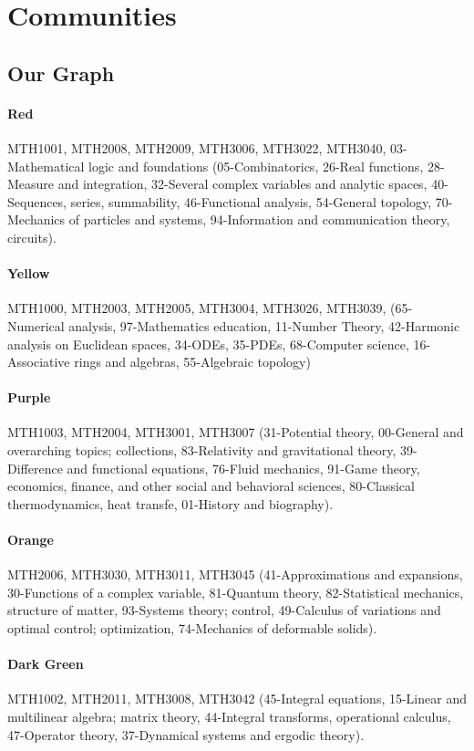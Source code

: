 \documentclass[english, 12pt]{article}
\begin{document}
\section{Communities}\label{app:communities_comp}
\subsection{Our Graph} \label{app:our_graph_communities}
\paragraph{Red} MTH1001, MTH2008, MTH2009, MTH3006, MTH3022, MTH3040,  03-Mathematical logic and foundations (05-Combinatorics, 26-Real functions, 28- Measure and integration, 32-Several complex variables and analytic spaces, 40-Sequences, series, summability, 46-Functional analysis, 54-General topology, 70-Mechanics of particles and systems, 94-Information and communication theory, circuits).
\parskip=-16.0pt
\paragraph{Yellow} MTH1000, MTH2003, MTH2005, MTH3004, MTH3026, MTH3039, (65-Numerical analysis, 97-Mathematics education, 11-Number Theory, 42-Harmonic analysis on Euclidean spaces, 34-ODEs, 35-PDEs, 68-Computer science, 16-Associative rings and algebras, 55-Algebraic topology)
\paragraph{Purple} MTH1003, MTH2004, MTH3001, MTH3007 (31-Potential theory, 00-General and overarching topics; collections, 83-Relativity and gravitational theory, 39-Difference and functional equations, 76-Fluid mechanics, 91-Game theory, economics, finance, and other social and behavioral sciences, 80-Classical thermodynamics, heat transfe, 01-History and biography).
\paragraph{Orange} MTH2006, MTH3030, MTH3011, MTH3045 (41-Approximations and expansions, 30-Functions of a complex variable, 81-Quantum theory, 82-Statistical mechanics, structure of matter, 93-Systems theory; control, 49-Calculus of variations and optimal control; optimization, 74-Mechanics of deformable solids).
\paragraph{Dark Green} MTH1002, MTH2011, MTH3008, MTH3042 (45-Integral equations, 15-Linear and multilinear algebra; matrix theory, 44-Integral transforms, operational calculus, 47-Operator theory, 37-Dynamical systems and ergodic theory).
\end{document}
